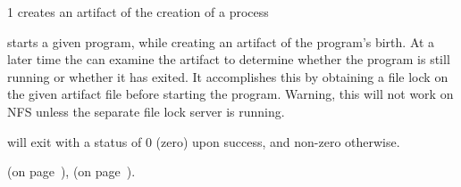 \begin{ManPage}{\label{man-flock-midwife}}{1}
{creates an artifact of the creation of a process}

\Synopsis {}


\Description {} starts a given program, while
creating an artifact of the program's birth.  At a later time the
 can examine the artifact to determine whether
the program is still running or whether it has exited.  It
accomplishes this by obtaining a file lock on the given artifact file
before starting the program.  Warning, this will not work on NFS
unless the separate file lock server is running.

\begin{Options}
\end{Options}

\ExitStatus
{} will exit with a status of 0 (zero) upon
success, and non-zero otherwise.

\SeeAlso
{} (on page~\pageref{man-uniq-pid-midwife}),
 (on page~\pageref{man-flock-undertaker}).

\end{ManPage}
